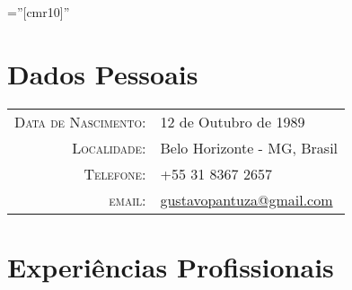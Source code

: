 \documentclass[a4paper,10pt]{article} %
\begin{document}
\pagestyle{empty} %

\font\fb=''[cmr10]'' %





\par{\bigskip\par} %

\section{Dados Pessoais}

\begin{tabular}{rl}
\textsc{Data de Nascimento:} & 12 de Outubro de 1989 \\
\textsc{Localidade:} & Belo Horizonte - MG, Brasil \\
\textsc{Telefone:} & +55 31 8367 2657\\
\textsc{email:} & \href{mailto:gustavopantuza@gmail.com}{gustavopantuza@gmail.com}
\end{tabular}





\section{Experiências Profissionais}
\end{document}
